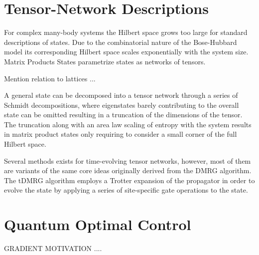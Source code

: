 \section{Tensor-Network Descriptions}
For complex many-body systems the Hilbert space grows too large for standard descriptions of states. Due to the combinatorial nature of the Bose-Hubbard model its corresponding Hilbert space scales exponentially with the system size. Matrix Products States parametrize states as networks of tensors.

Mention relation to lattices ...

A general state can be decomposed into a tensor network through a series of Schmidt decompositions, where eigenstates barely contributing to the overall state can be omitted resulting in a truncation of the dimensions of the tensor. The truncation along with an area law scaling of entropy with the system results in matrix product states only requiring to consider a small corner of the full Hilbert space.

Several methods exists for time-evolving tensor networks, however, most of them are variants of the same core ideas originally derived from the DMRG algorithm. The tDMRG algorithm employs a Trotter expansion of the propagator in order to evolve the state by applying a series of site-specific gate operations to the state.

\section{Quantum Optimal Control}

GRADIENT MOTIVATION ....

